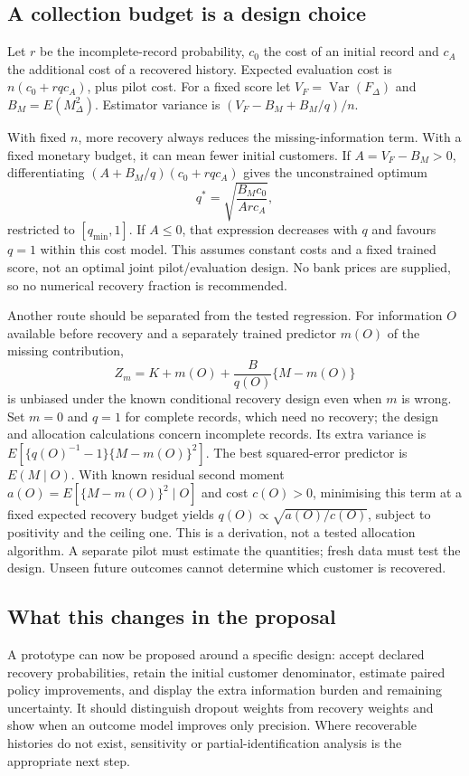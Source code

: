 \subsection{A collection budget is a design choice}
Let $r$ be the incomplete-record probability, $c_0$ the cost of an initial
record and $c_A$ the additional cost of a recovered history. Expected
evaluation cost is $n(c_0+rqc_A)$, plus pilot cost. For a fixed score let
$V_F=\operatorname{Var}(F_\Delta)$ and $B_M=E(M_\Delta^2)$. Estimator
variance is $(V_F-B_M+B_M/q)/n$.

With fixed $n$, more recovery always reduces the missing-information term.
With a fixed monetary budget, it can mean fewer initial customers. If
$A=V_F-B_M>0$, differentiating
$(A+B_M/q)(c_0+rqc_A)$ gives the unconstrained optimum
\[
q^*=\sqrt{\frac{B_Mc_0}{A r c_A}},
\]
restricted to $[q_{\min},1]$. If $A\leq0$, that expression decreases with
$q$ and favours $q=1$ within this cost model. This assumes constant costs
and a fixed trained score, not an optimal joint pilot/evaluation design.
No bank prices are supplied, so no numerical recovery fraction is recommended.

Another route should be separated from the tested regression. For information
$O$ available before recovery and a separately trained predictor $m(O)$ of
the missing contribution,
\[
Z_m=K+m(O)+\frac{B}{q(O)}\{M-m(O)\}
\]
is unbiased under the known conditional recovery design even when $m$ is
wrong. Set $m=0$ and $q=1$ for complete records, which need no recovery; the design
and allocation calculations concern incomplete records. Its extra variance is
$E[\{q(O)^{-1}-1\}\{M-m(O)\}^2]$.
The best squared-error predictor is $E(M\mid O)$. With known residual
second moment $a(O)=E[\{M-m(O)\}^2\mid O]$ and cost $c(O)>0$, minimising
this term at a fixed expected recovery budget yields
$q(O)\propto\sqrt{a(O)/c(O)}$, subject to positivity and the ceiling one.
This is a derivation, not a tested allocation algorithm. A separate pilot
must estimate the quantities; fresh data must test the design. Unseen
future outcomes cannot determine which customer is recovered.

\subsection{What this changes in the proposal}
A prototype can now be proposed around a specific design: accept declared
recovery probabilities, retain the initial customer denominator, estimate
paired policy improvements, and display the extra information burden and
remaining uncertainty. It should distinguish dropout weights from recovery
weights and show when an outcome model improves only precision. Where
recoverable histories do not exist, sensitivity or partial-identification
analysis is the appropriate next step.

